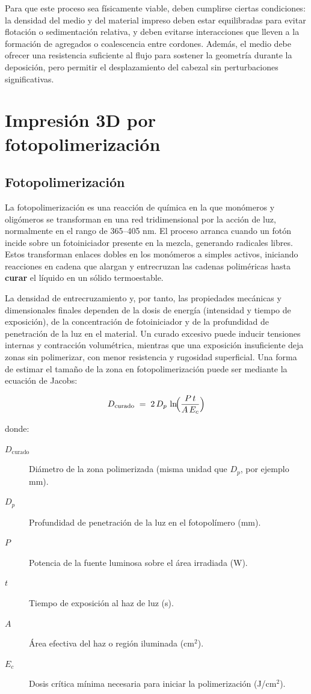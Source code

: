 Para que este proceso sea físicamente viable, deben cumplirse ciertas condiciones: la densidad del medio y del material impreso deben estar equilibradas para evitar flotación o sedimentación relativa, y deben evitarse interacciones que lleven a la formación de agregados o coalescencia entre cordones. Además, el medio debe ofrecer una resistencia suficiente al flujo para sostener la geometría durante la deposición, pero permitir el desplazamiento del cabezal sin perturbaciones significativas.

 
\section{Impresión 3D por fotopolimerización}

\subsection{Fotopolimerización}

La fotopolimerización es una reacción de química en la que monómeros y oligómeros se transforman en una red tridimensional por la acción de luz, normalmente en el rango de 365–405 nm. El proceso arranca cuando un fotón incide sobre un fotoiniciador presente en la mezcla, generando radicales libres. Estos transforman enlaces dobles en los monómeros a simples activos, iniciando reacciones en cadena que alargan y entrecruzan las cadenas poliméricas hasta \textbf{curar} el líquido en un sólido termoestable.

La densidad de entrecruzamiento y, por tanto, las propiedades mecánicas y dimensionales finales dependen de la dosis de energía (intensidad y tiempo de exposición), de la concentración de fotoiniciador y de la profundidad de penetración de la luz en el material. Un curado excesivo puede inducir tensiones internas y contracción volumétrica, mientras que una exposición insuficiente deja zonas sin polimerizar, con menor resistencia y rugosidad superficial. Una forma de estimar el tamaño de la zona en fotopolimerización puede ser mediante la ecuación de Jacobs:

\begin{equation}
	D_{\mathrm{curado}} \;=\; 2\,D_{p}\,\ln\!\Bigl(\frac{P\,t}{A\,E_{c}}\Bigr)
\end{equation}

donde:

\begin{description}
	\item[$D_{\mathrm{curado}}$] Diámetro de la zona polimerizada (misma unidad que $D_{p}$, por ejemplo mm).
	\item[$D_{p}$] Profundidad de penetración de la luz en el fotopolímero (mm).
	\item[$P$] Potencia de la fuente luminosa sobre el área irradiada (W).
	\item[$t$] Tiempo de exposición al haz de luz (s).
	\item[$A$] Área efectiva del haz o región iluminada (cm$^2$).
	\item[$E_{c}$] Dosis crítica mínima necesaria para iniciar la polimerización (J/cm$^2$).
\end{description}


